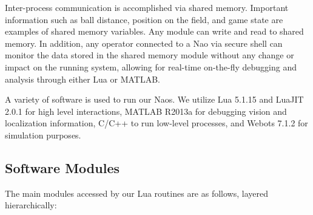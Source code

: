 \documentclass{article}
\begin{document}
	Inter-process communication is accomplished via shared memory. Important information such as ball distance, position on the field, and game state are examples of shared memory variables. Any module can write and read to shared memory. In addition, any operator connected to a Nao via secure shell can monitor the data stored in the shared memory module without any change or impact on the running system, allowing for real-time on-the-fly debugging and analysis through either Lua or MATLAB.

	A variety of software is used to run our Naos. We utilize Lua 5.1.15 and LuaJIT 2.0.1 for high level interactions, MATLAB R2013a for debugging vision and localization information, C/C++ to run low-level processes, and Webots 7.1.2 for simulation purposes.


  \subsection{Software Modules}
  	The main modules accessed by our Lua routines are as follows, layered hierarchically:
\end{document}
